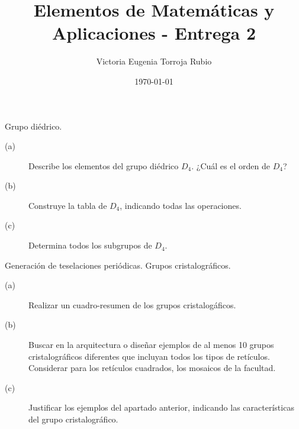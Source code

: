 \documentclass{article}
\begin{document}
\title{Elementos de Matemáticas y Aplicaciones - Entrega 2}
\author{Victoria Eugenia Torroja Rubio}
\date{\today}

\maketitle

\begin{ej}
Grupo diédrico.
\begin{description}
\item[(a)] Describe los elementos del grupo diédrico $\displaystyle D_{4} $. ¿Cuál es el orden de $\displaystyle D_{4} $?
\item[(b)] Construye la tabla de $\displaystyle D_{4} $, indicando todas las operaciones.
\item[(c)] Determina todos los subgrupos de $\displaystyle D_{4} $.
\end{description}
\end{ej}

\begin{ej}
Generación de teselaciones periódicas. Grupos cristalográficos.
\begin{description}
\item[(a)] Realizar un cuadro-resumen de los grupos cristalogáficos.
\item[(b)] Buscar en la arquitectura o diseñar ejemplos de al menos 10 grupos cristalográficos diferentes que incluyan todos los tipos de retículos. Considerar para los retículos cuadrados, los mosaicos de la facultad.
\item[(c)] Justificar los ejemplos del apartado anterior, indicando las características del grupo cristalográfico.
\end{description}
\end{ej}
\end{document}
